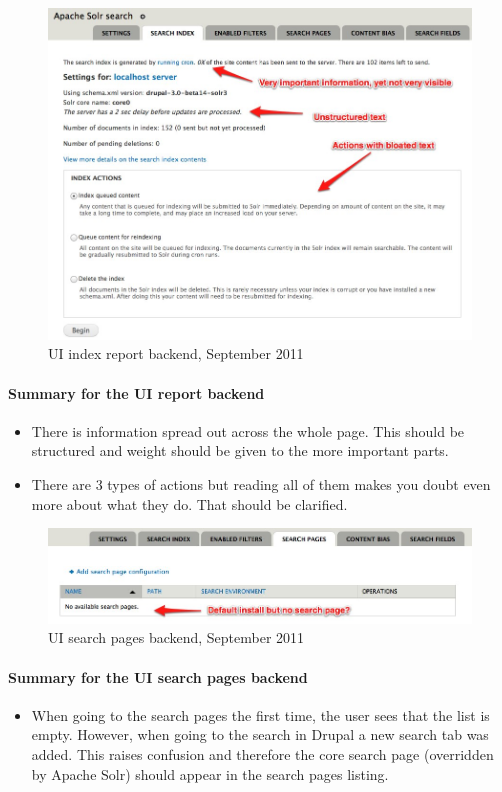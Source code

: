 \begin{figure}[H]
     \includegraphics[width=\textwidth]{images/apachesolr_ui_backend_september_2011_2.jpg}
     \caption{UI index report backend, September 2011}
\end{figure}
\paragraph{Summary for the UI report backend}
\begin{itemize}
\item There is information spread out across the whole page. This should be structured and weight should be given to the more important parts.
\item There are 3 types of actions but reading all of them makes you doubt even more about what they do. That should be clarified.
\end{itemize}


\begin{figure}[H]
     \includegraphics[width=\textwidth]{images/apachesolr_ui_backend_september_2011_3.jpg}
     \caption{UI search pages backend, September 2011}
\end{figure}
\paragraph{Summary for the UI search pages backend}
\begin{itemize}
\item When going to the search pages the first time, the user sees that the list is empty. However, when going to the search in Drupal a new search tab was added. This raises confusion and therefore the core search page (overridden by Apache Solr) should appear in the search pages listing.
\end{itemize}

